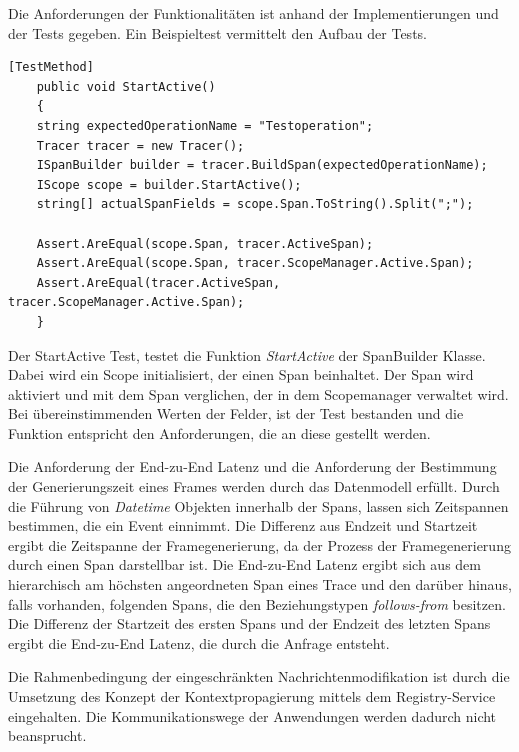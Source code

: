 Die Anforderungen der Funktionalitäten ist anhand der Implementierungen und der Tests gegeben. Ein Beispieltest vermittelt den Aufbau der Tests.

\begin{minipage}[]{\textwidth}
	\begin{lstlisting}[frame=trBL]
	[TestMethod]
	public void StartActive()
	{
	string expectedOperationName = "Testoperation";
	Tracer tracer = new Tracer();
	ISpanBuilder builder = tracer.BuildSpan(expectedOperationName);
	IScope scope = builder.StartActive();
	string[] actualSpanFields = scope.Span.ToString().Split(";");
	
	Assert.AreEqual(scope.Span, tracer.ActiveSpan);
	Assert.AreEqual(scope.Span, tracer.ScopeManager.Active.Span);
	Assert.AreEqual(tracer.ActiveSpan, tracer.ScopeManager.Active.Span);
	}
	\end{lstlisting}
	\label{listing:Unit-Test der Spanbuilder Klasse}
\end{minipage}

Der StartActive Test, testet die Funktion \emph{StartActive} der SpanBuilder Klasse. Dabei wird ein Scope initialisiert, der einen Span beinhaltet. Der Span wird aktiviert und mit dem Span verglichen, der in dem Scopemanager verwaltet wird. Bei übereinstimmenden Werten der Felder, ist der Test bestanden und die Funktion entspricht den Anforderungen, die an diese gestellt werden.

Die Anforderung der End-zu-End Latenz und die Anforderung der Bestimmung der Generierungszeit eines Frames werden durch das Datenmodell erfüllt. Durch die Führung von \emph{Datetime} Objekten innerhalb der Spans, lassen sich Zeitspannen bestimmen, die ein Event einnimmt. Die Differenz aus Endzeit und Startzeit ergibt die Zeitspanne der Framegenerierung, da der Prozess der Framegenerierung durch einen Span darstellbar ist. Die End-zu-End Latenz ergibt sich aus dem hierarchisch am höchsten angeordneten Span eines Trace und den darüber hinaus, falls vorhanden, folgenden Spans, die den Beziehungstypen \emph{follows-from} besitzen. Die Differenz der Startzeit des ersten Spans und der Endzeit des letzten Spans ergibt die End-zu-End Latenz, die durch die Anfrage entsteht.

Die Rahmenbedingung der eingeschränkten Nachrichtenmodifikation ist durch die Umsetzung des Konzept der Kontextpropagierung mittels dem Registry-Service eingehalten. Die Kommunikationswege der Anwendungen werden dadurch nicht beansprucht.


